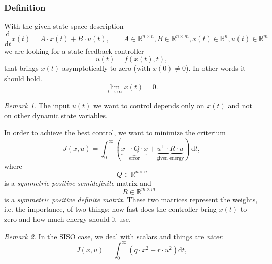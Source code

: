 \documentclass[a4paper,12 pt]{article}
\numberwithin{equation}{section}
\theoremstyle{definition}
\theoremstyle{remark}
\newtheorem*{bmk}{Remark}
\theoremstyle{definition}
\theoremstyle{definition}
\theoremstyle{definition}
\theoremstyle{remark}
\begin{document}
\subsubsection{Definition}
With the given state-space description
\begin{equation}
\frac{\text{d}}{\text{d}t}x(t)=A\cdot x(t)+B\cdot u(t), \qquad A\in\mathbb{R}^{n\times n}, B\in\mathbb{R}^{n\times m},
x(t) \in\mathbb{R}^{n},
u(t) \in\mathbb{R}^{m}
\end{equation}
we are looking for a state-feedback controller
\begin{equation}
u(t)=f(x(t),t),
\end{equation}
that brings $x(t)$ asymptotically   to zero (with $x(0)\neq 0$). In other words it should hold.
\begin{equation}
\lim_{t\to\infty}x(t)=0.
\end{equation}
\begin{bmk}
The input $u(t)$ we want to control depends only on $x(t)$ and not on other dynamic state variables.
\end{bmk}
In order to achieve the best control, we want to minimize the criterium
\begin{equation}\label{krit}
J(x,u)=\int_0^\infty(
\underset{\text{error}}{\underbrace{x^\intercal\cdot Q\cdot x}} +
\underset{\text{{given energy}}}{\underbrace{u^\intercal\cdot R\cdot u}})\,\text{d}t,
\end{equation}
where
\begin{equation}
Q\in\mathbb{R}^{n\times n}
\end{equation}
is a \textit{symmetric positive semidefinite} matrix and
\begin{equation}
\qquad R\in\mathbb{R}^{m\times m}
\end{equation} is a \textit{symmetric positive definite matrix}. These two matrices represent the weights, i.e. the importance, of two things: how fast does the controller bring $x(t)$ to zero and how much energy should it use.\\
\begin{bmk}
In the SISO case, we deal with scalars and things are \textit{nicer}:
\begin{equation}
J(x,u)=\int_0^\infty(
q\cdot x^2+r\cdot u^2)\text{d}t,
\end{equation}

\end{bmk}
\end{document}
